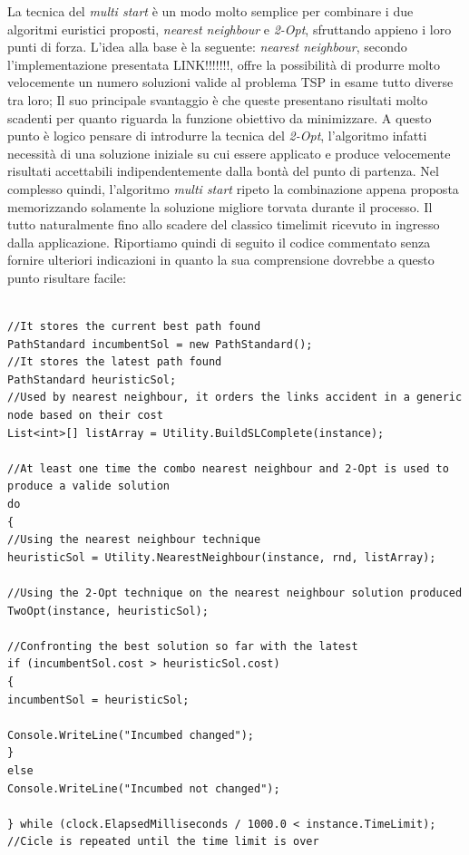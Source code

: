 \documentclass[11pt]{article}
\begin{document}
La tecnica del \textit{multi start} è un modo molto semplice per combinare i due algoritmi euristici proposti, \textit{nearest neighbour} e \textit{2-Opt}, sfruttando appieno i loro punti di forza.
L'idea alla base è la seguente: \textit{nearest neighbour}, secondo l'implementazione presentata LINK!!!!!!!, offre la possibilità di produrre molto velocemente un numero soluzioni valide al problema TSP in esame tutto diverse tra loro; Il suo principale svantaggio è che queste presentano risultati molto scadenti per quanto riguarda la funzione obiettivo da minimizzare. A questo punto è logico pensare di introdurre la tecnica del \textit{2-Opt}, l'algoritmo infatti necessità di una soluzione iniziale su cui essere applicato e produce velocemente risultati accettabili indipendentemente dalla bontà del punto di partenza.
Nel complesso quindi, l'algoritmo \textit{multi start} ripeto la combinazione appena proposta memorizzando solamente la soluzione migliore torvata durante il processo. Il tutto naturalmente fino allo scadere del classico timelimit ricevuto in ingresso dalla applicazione.
Riportiamo quindi di seguito il codice commentato senza fornire ulteriori indicazioni in quanto la sua comprensione dovrebbe a questo punto risultare facile:

\begin{lstlisting}

//It stores the current best path found
PathStandard incumbentSol = new PathStandard();
//It stores the latest path found
PathStandard heuristicSol;
//Used by nearest neighbour, it orders the links accident in a generic node based on their cost
List<int>[] listArray = Utility.BuildSLComplete(instance);

//At least one time the combo nearest neighbour and 2-Opt is used to produce a valide solution
do
{
//Using the nearest neighbour technique
heuristicSol = Utility.NearestNeighbour(instance, rnd, listArray);

//Using the 2-Opt technique on the nearest neighbour solution produced
TwoOpt(instance, heuristicSol);

//Confronting the best solution so far with the latest
if (incumbentSol.cost > heuristicSol.cost)
{
incumbentSol = heuristicSol;

Console.WriteLine("Incumbed changed");
}
else
Console.WriteLine("Incumbed not changed");

} while (clock.ElapsedMilliseconds / 1000.0 < instance.TimeLimit); //Cicle is repeated until the time limit is over

\end{lstlisting}
\end{document}
